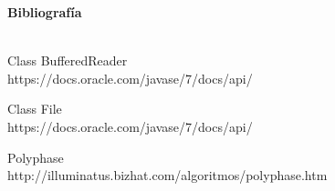 \documentclass[12pt,a4paper]{article}
\begin{document}
	\newpage
	\Large \textbf{Bibliografía}
	\\
	\\
	\item Class BufferedReader
	\\https://docs.oracle.com/javase/7/docs/api/
	\\
	\item Class File
	\\https://docs.oracle.com/javase/7/docs/api/
	\item Polyphase
	\\http://illuminatus.bizhat.com/algoritmos/polyphase.htm
	\normalsize
	\begin{itemize}
		
	\end{itemize}
\end{document}
